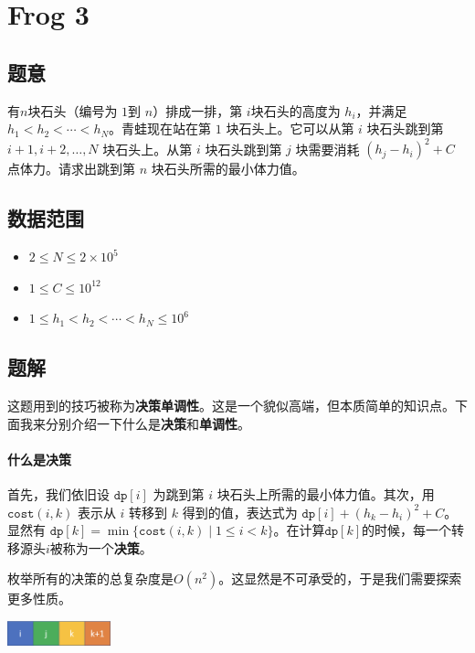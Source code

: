 \section{Frog 3}
\subsection*{题意}
有$n$块石头（编号为 $1$到 $n$）排成一排，第 $i$块石头的高度为 $h_i$，并满足 $h_1 < h_2 < \cdots < h_N$。青蛙现在站在第 $1$ 块石头上。它可以从第 $i$ 块石头跳到第 $i + 1, i + 2, \ldots, N$ 块石头上。从第 $i$ 块石头跳到第 $j$ 块需要消耗 $(h_j - h_i)^2+C$ 点体力。请求出跳到第 $n$ 块石头所需的最小体力值。
\subsection*{数据范围}
\begin{itemize}
\item $2 \leq N \leq 2 \times 10^5$
\item $1 \leq C \leq 10^{12}$
\item $1 \leq h_1 < h_2 < \cdots < h_N \leq 10^6$
\end{itemize}

\subsection*{题解}
这题用到的技巧被称为\textbf{决策单调性}。这是一个貌似高端，但本质简单的知识点。下面我来分别介绍一下什么是\textbf{决策}和\textbf{单调性}。

\paragraph{什么是决策}首先，我们依旧设 $\texttt{dp}[i]$ 为跳到第 $i$ 块石头上所需的最小体力值。其次，用 $\texttt{cost}(i,k)$ 表示从 $i$ 转移到 $k$ 得到的值，表达式为 $\texttt{dp}[i] + (h_k - h_i)^2+C$。显然有 $\texttt{dp}[k] = \min\{\texttt{cost}(i,k) \mid 1\le i<k\}$。在计算$\texttt{dp}[k]$的时候，每一个转移源头$i$被称为一个\textbf{决策}。

枚举所有的决策的总复杂度是$O(n^2)$。这显然是不可承受的，于是我们需要探索更多性质。

\begin{center}
\includegraphics[width=3cm]{./Pics/IJK.png}
\end{center}

